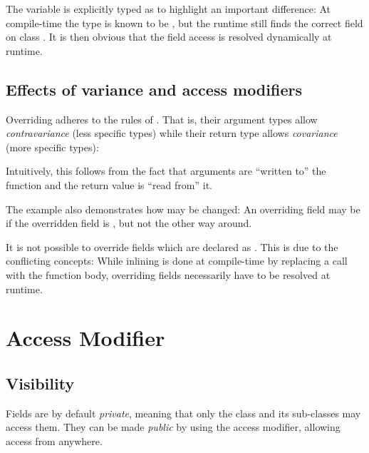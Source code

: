\documentclass{haxe}
\begin{document}
The variable  is explicitly typed as  to highlight an important difference: At compile-time the type is known to be , but the runtime still finds the correct field  on class . It is then obvious that the field access is resolved dynamically at runtime.

\subsection{Effects of variance and access modifiers}
\label{class-field-override-effects}

Overriding adheres to the rules of . That is, their argument types allow \emph{contravariance} (less specific types) while their return type allows \emph{covariance} (more specific types):


Intuitively, this follows from the fact that arguments are ``written to'' the function and the return value is ``read from'' it.

The example also demonstrates how  may be changed: An overriding field may be  if the overridden field is , but not the other way around.

It is not possible to override fields which are declared as . This is due to the conflicting concepts: While inlining is done at compile-time by replacing a call with the function body, overriding fields necessarily have to be resolved at runtime.
	
	
	
\section{Access Modifier}
\label{class-field-access-modifier}

\subsection{Visibility}
\label{class-field-visibility}

Fields are by default \emph{private}, meaning that only the class and its sub-classes may access them. They can be made \emph{public} by using the  access modifier, allowing access from anywhere.

\end{document}
